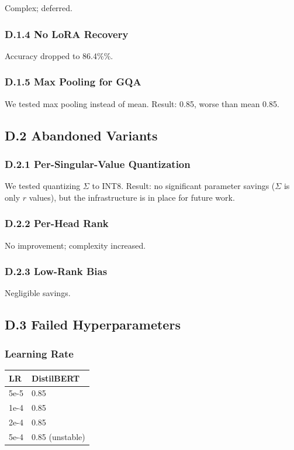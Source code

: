 Complex; deferred.

\subsubsection{D.1.4 No LoRA Recovery}

Accuracy dropped to 86.4\%\%.

\subsubsection{D.1.5 Max Pooling for GQA}

We tested max pooling instead of mean. Result: 0.85, worse than mean 
0.85.

\subsection{D.2 Abandoned Variants}

\subsubsection{D.2.1 Per-Singular-Value Quantization}

We tested quantizing $\Sigma$ to INT8. Result: no significant parameter 
savings ($\Sigma$ is only $r$ values), but the infrastructure is in place for 
future work.

\subsubsection{D.2.2 Per-Head Rank}

No improvement; complexity increased.

\subsubsection{D.2.3 Low-Rank Bias}

Negligible savings.

\subsection{D.3 Failed Hyperparameters}

\subsubsection{Learning Rate}

\begin{table}[H]
\centering
\small
\begin{tabular}{ll}
\toprule
\textbf{LR} & \textbf{DistilBERT} \\
\midrule
5e-5 & 0.85 \\
1e-4 & 0.85 \\
2e-4 & 0.85 \\
5e-4 & 0.85 (unstable) \\
\bottomrule
\end{tabular}
\end{table}

